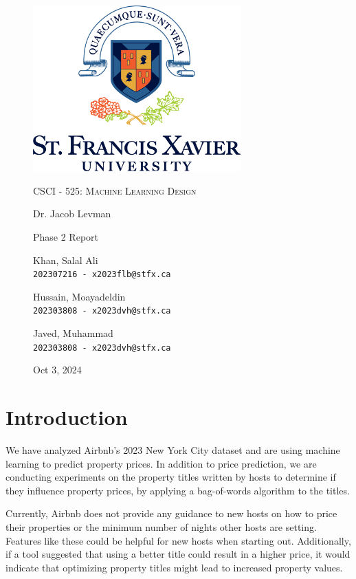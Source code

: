 \documentclass[a4paper,12pt]{article}
\begin{document}
\begin{titlepage}

\begin{figure}[H]
  \centering
  \includegraphics[width=8cm]{../stfx_logo.png}\par
  \vspace{1cm}
  {\scshape\Large CSCI - 525: Machine Learning Design \par}
  \vspace{0.5cm}
  {\large Dr. Jacob Levman \par}
  \vspace{1cm}
  {\Large Phase 2 Report \par}
  \vspace{1cm}
  {\large Khan, Salal Ali\\ \texttt{202307216 - x2023flb@stfx.ca} \par}
  \vspace{0.5cm}
  {\large Hussain, Moayadeldin\\ \texttt{202303808 - x2023dvh@stfx.ca} \par}
  \vspace{0.5cm}
  {\large Javed, Muhammad\\ \texttt{202303808 - x2023dvh@stfx.ca} \par}
  \vfill
  \vspace{0.5cm}
  {\large Oct 3, 2024 \par}
\end{figure}

\end{titlepage}

\section*{Introduction}

We have analyzed Airbnb's 2023 New York City dataset and are using machine learning to predict property prices. In addition to price prediction, we are conducting experiments on the property titles written by hosts to determine if they influence property prices, by applying a bag-of-words algorithm to the titles.

Currently, Airbnb does not provide any guidance to new hosts on how to price their properties or the minimum number of nights other hosts are setting. Features like these could be helpful for new hosts when starting out. Additionally, if a tool suggested that using a better title could result in a higher price, it would indicate that optimizing property titles might lead to increased property values.
\end{document}
